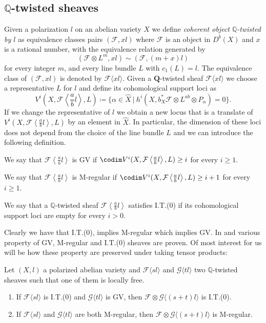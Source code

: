 \documentclass[11pt,letter]{amsart}
\numberwithin{equation}{section}
\begin{document}
\subsection{$\mathbb{Q}$-twisted sheaves}\label{sec2.2}
Given a polarization $l$ on an abelian variety $X$ we define \emph{coherent object $\mathbb{Q}$-twisted by $l$} as equivalence classes pairs $(\mathcal{F}, xl)$ where $\mathcal{F}$ is an object in $D^b(X)$ and $x$ is a rational number, with the equivalence relation generated by
$$
(\mathcal{F}\otimes L^m,xl)\sim(\mathcal{F},(m+x)l)
$$
for every integer $m$, and every line bundle $L$ with $c_1(L)=l$. The equivalence class of $(\mathcal{F},xl)$ is denoted by $\mathcal{F}\langle xl\rangle$. Given a $\mathbf{Q}$-twisted sheaf $\mathcal{F}\langle xl\rangle$ we choose a representative $L$ for $l$ and define its cohomological support loci as
$$
V^i\left(X, \mathcal{F}\left\langle \frac{a}{b}l\right\rangle, L\right)\coloneqq\{  \alpha\in\hat{X}\:|\:h^i(X, b_X^*\mathcal{F}\otimes L^{ab}\otimes P_  \alpha)=0\}.
$$
If we change the representative of $l$ we obtain a new locus that is a translate of $V^i\left(X, \mathcal{F}\left\langle \frac{a}{b}l\right\rangle, L\right)$ by an element in $\hat{X}$. In particular, the dimension of these loci does not depend from the choice of the line bundle $L$ and we can introduce the following definition.
\begin{defi}\label{def2.1}
 We say that $\mathcal{F}\left\langle \frac{a}{b}l\right\rangle$ is GV if $\codim V^i(X,\mathcal{F}\left\langle \frac{a}{b}l\right\rangle, L)\ge i$ for every $i\ge 1$.\par
We say that $\mathcal{F}\left\langle \frac{a}{b}l\right\rangle$ is M-regular if $\codim V^i(X,\mathcal{F}\left\langle \frac{a}{b}l\right\rangle, L)\ge i+1$ for every $i\ge 1$.\par
We say that a $\mathbb{Q}$-twisted sheaf $\mathcal{F}\left\langle \frac{a}{b}l\right\rangle$ satisfies I.T.(0) if its cohomological support loci are empty for every $i>0$. 
\end{defi}
Clearly we have that I.T.(0), implies M-regular which implies GV. In \cite{Caucci} and \cite{Ito22} various property of GV, M-regular and I.T.(0) sheaves are proven. Of most interest for us will be how these property are preserved under taking tensor products:
\begin{prop}\label{caucci}
Let $(X,l)$ a polarized abelian variety and  $\mathcal{F}\langle sl\rangle$ and $\mathcal{G}\langle tl\rangle$ two $\mathbb{Q}$-twisted sheaves such that one of them is locally free.
\begin{enumerate}
\item If $\mathcal{F}\langle sl\rangle$ is I.T.(0) and $\mathcal{G}\langle tl\rangle$ is GV, then $\mathcal{F}\otimes\mathcal{G}\langle(s+t)l\rangle$ is I.T.(0).
\item If $\mathcal{F}\langle sl\rangle$ and $\mathcal{G}\langle tl\rangle$ are both M-regular, then $\mathcal{F}\otimes\mathcal{G}\langle(s+t)l\rangle$ is M-regular.
\end{enumerate}
\end{prop}
\end{document}
